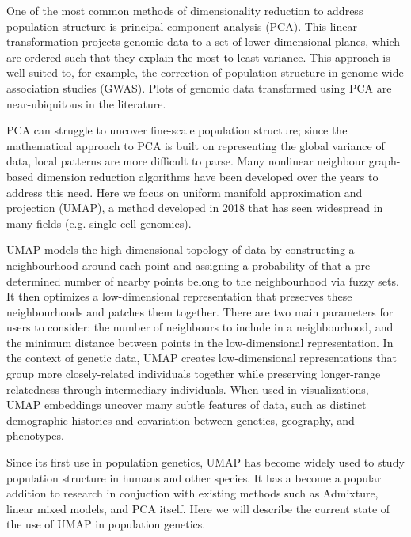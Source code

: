 \documentclass[12pt]{article}
\begin{document}
One of the most common methods of dimensionality reduction to address population structure is principal component analysis (PCA). This linear transformation projects genomic data to a set of lower dimensional planes, which are ordered such that they explain the most-to-least variance. This approach is well-suited to, for example, the correction of population structure in genome-wide association studies (GWAS).\cite{patterson2006population} Plots of genomic data transformed using PCA are near-ubiquitous in the literature.

PCA can struggle to uncover fine-scale population structure; since the mathematical approach to PCA is built on representing the global variance of data, local patterns are more difficult to parse. Many nonlinear neighbour graph-based dimension reduction algorithms have been developed over the years to address this need. Here we focus on uniform manifold approximation and projection (UMAP)\cite{mcinnes_umap_2018}, a method developed in 2018 that has seen widespread in many fields (e.g. single-cell genomics\cite{becht_dimensionality_2019}). 

UMAP models the high-dimensional topology of data by constructing a neighbourhood around each point and assigning a probability of that a pre-determined number of nearby points belong to the neighbourhood via fuzzy sets. It then optimizes a low-dimensional representation that preserves these neighbourhoods and patches them together. There are two main parameters for users to consider: the number of neighbours to include in a neighbourhood, and the minimum distance between points in the low-dimensional representation. In the context of genetic data, UMAP creates low-dimensional representations that group more closely-related individuals together while preserving longer-range relatedness through intermediary individuals. When used in visualizations, UMAP embeddings uncover many subtle features of data, such as distinct demographic histories and covariation between genetics, geography, and phenotypes\cite{diaz-papkovich_umap_2019}.

Since its first use in population genetics, UMAP has become widely used to study population structure in humans and other species. It has a become a popular addition to research in conjuction with existing methods such as Admixture, linear mixed models, and PCA itself. Here we will describe the current state of the use of UMAP in population genetics.

\end{document}

